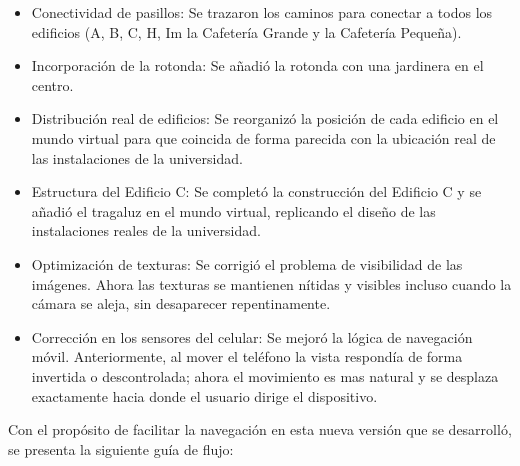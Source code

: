 \documentclass[conference]{IEEEtran}
\begin{document}
\begin{itemize}
	\item Conectividad de pasillos: Se trazaron los caminos para conectar a todos los edificios (A, B, C, H, Im la Cafetería Grande y la Cafetería Pequeña).
	
	\vspace{0.2cm}
	
	\item Incorporación de la rotonda: Se añadió la rotonda con una jardinera en el centro.
	
	\vspace{0.2cm}
	
	\item Distribución real de edificios: Se reorganizó la posición de cada edificio en el mundo virtual para que coincida de forma parecida con la ubicación real de las instalaciones de la universidad.
	
	\vspace{0.2cm}
	
	\item Estructura del Edificio C: Se completó la construcción del Edificio C y se añadió el tragaluz en el mundo virtual, replicando el diseño de las instalaciones reales de la universidad.
	
	\vspace{0.2cm}
	
	\item Optimización de texturas: Se corrigió el problema de visibilidad de las imágenes. Ahora las texturas se mantienen nítidas y visibles incluso cuando la cámara se aleja, sin desaparecer repentinamente.
	
	\vspace{0.2cm}
	
	\item Corrección en los sensores del celular: Se mejoró la lógica de navegación móvil. Anteriormente, al mover el teléfono la vista respondía de forma invertida o descontrolada; ahora el movimiento es mas natural y se desplaza exactamente hacia donde el usuario dirige el dispositivo.
\end{itemize}

\vspace{0.2cm}

Con el propósito de facilitar la navegación en esta nueva versión que se desarrolló, se presenta la siguiente guía de flujo:
\end{document}
